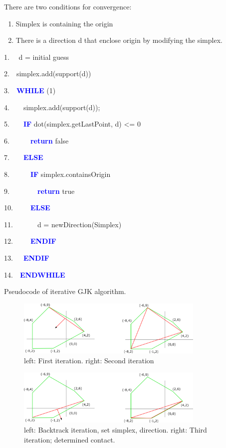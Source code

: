 \documentclass[times,12pt]{ACME2015article}
\newenvironment{lyxcode}
{\par\begin{list}{}{
\setlength{\rightmargin}{\leftmargin}
\setlength{\listparindent}{0pt}%
\raggedright
\setlength{\itemsep}{0pt}
\setlength{\parsep}{0pt}
\normalfont\ttfamily}%
 \item[]}
{\end{list}}
\begin{document}
There are two conditions for convergence:
\begin{enumerate}
\item Simplex is containing the origin 
\item There is a direction d that enclose origin by modifying the simplex.
\end{enumerate}

\begin{algorithm}
\begin{lyxcode}

1.~~ d = initial guess 

2.~~simplex.add(support(d)) 

3.~~\textbf{\textcolor{blue}{WHILE}} (1)

4.~~~~simplex.add(support(d));

5.~~~~\textbf{\textcolor{blue}{IF}}  dot(simplex.getLastPoint, d) <= 0 

6.~~~~~~\textbf{\textcolor{blue}{return}} false 

7.~~~~\textbf{\textcolor{blue}{ELSE}}  

8.~~~~~~\textbf{\textcolor{blue}{IF}} simplex.containsOrigin 

9.~~~~~~~~\textbf{\textcolor{blue}{return}} true 

10.~~~~~\textbf{\textcolor{blue}{ELSE}} 


11.~~~~~~~d = newDirection(Simplex) 

12.~~~~~\textbf{\textcolor{blue}{ENDIF}} 

13.~~~\textbf{\textcolor{blue}{ENDIF}} 

14.~~\textbf{\textcolor{blue}{ENDWHILE}}
\end{lyxcode}
\protect\caption{\label{alg3}Pseudocode of iterative GJK algorithm.}
\end{algorithm}
 
\begin{figure}[!h]
\centering
\includegraphics[width=0.8\textwidth]{3} \protect\caption{\label{fig4}left: First iteration. right: Second iteration}
\end{figure} 

\begin{figure}[!h]
\centering
\includegraphics[width=0.8\textwidth]{4} \protect\caption{\label{fig5}left: Backtrack iteration, set simplex, direction. right: Third iteration; determined contact. }
\end{figure}
\end{document}
